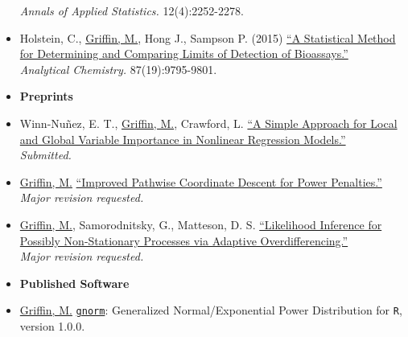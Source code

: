 \documentclass[11pt]{article}
\newcommand{\tab}{\hspace*{2em}}
\begin{document}
\begin{itemize}
	\tab \emph{ Annals of Applied Statistics.} 12(4):2252-2278.  \vspace{-2mm}
	\item[] Holstein, C., \underline{Griffin, M.}, Hong J., Sampson P. (2015) \href{https://pubs.acs.org/doi/abs/10.1021/acs.analchem.5b02082}{``A Statistical Method for Determining and Comparing Limits of Detection of Bioassays.''} \\
	\tab \emph{Analytical Chemistry.} 87(19):9795-9801.\vspace{-2mm}
	\item[] \textbf{Preprints} \vspace{-2mm}
		\item[] Winn-Nu\~{n}ez, E. T., \underline{Griffin, M.}, Crawford, L. \href{https://arxiv.org/abs/2302.02024}{``A Simple Approach for Local and Global Variable Importance in Nonlinear Regression Models.''} \\
	\tab \emph{Submitted.} \vspace{-2mm}
	\item[] \underline{Griffin, M.} \href{https://arxiv.org/pdf/2203.02596}{``Improved Pathwise Coordinate Descent for Power Penalties.''} \\
	\tab \emph{Major revision requested.} \vspace{-2mm}
	\item[] \underline{Griffin, M.}, Samorodnitsky, G., Matteson, D. S. \href{https://arxiv.org/abs/2011.04168}{``Likelihood Inference for Possibly Non-Stationary Processes via Adaptive Overdifferencing.''} \\
	\tab \emph{Major revision requested.} \vspace{-2mm}
	\item[] \textbf{Published Software} \vspace{-2mm}
	\item[] \underline{Griffin, M.} \href{https://cran.r-project.org/web/packages/gnorm/index.html}{\texttt{gnorm}}: Generalized Normal/Exponential Power Distribution for \texttt{R},  version 1.0.0.  \\
	 \vspace{-2mm}
\end{itemize}
\end{document}
